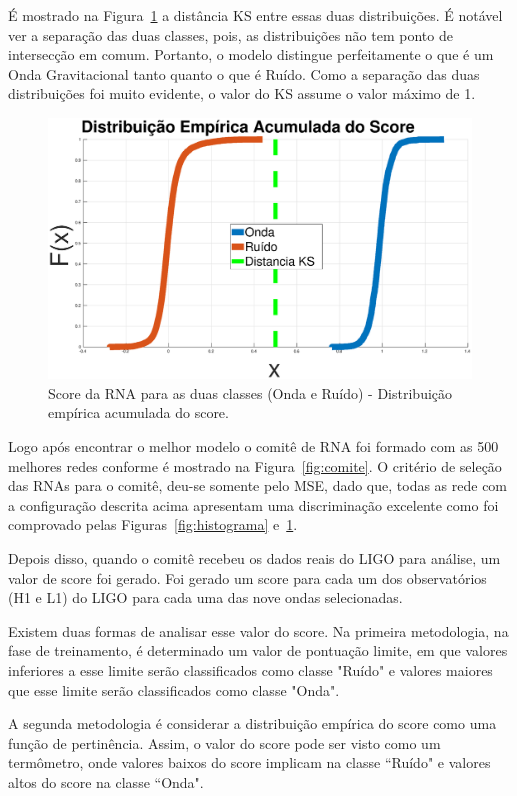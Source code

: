 É mostrado na Figura~\ref{fig:KS} a distância KS entre essas duas distribuições. É notável ver a separação das duas classes, pois, as distribuições não tem ponto de intersecção em comum. Portanto, o modelo distingue perfeitamente o que é um Onda Gravitacional tanto quanto o que é Ruído. Como a separação das duas distribuições foi muito evidente, o valor do KS assume o valor máximo de 1.

\begin{figure}[H]
\centering
\includegraphics[width=1\textwidth]{figuras/KS.eps}
\caption{Score da RNA para as duas classes (Onda e Ruído) - Distribuição  empírica acumulada do score.}
\label{fig:KS}
\end{figure}

Logo após encontrar o melhor modelo o comitê de RNA foi formado com as 500 melhores redes conforme é mostrado na Figura~\ref{fig:comite}. O critério de seleção das RNAs para o comitê, deu-se somente pelo MSE, dado que, todas as rede com a configuração descrita acima apresentam uma discriminação excelente como foi comprovado pelas Figuras~\ref{fig:histograma} e~\ref{fig:KS}.

Depois disso, quando o comitê recebeu os dados reais do LIGO para análise, um valor de score foi gerado. Foi gerado um score para cada um dos observatórios (H1 e L1) do LIGO para cada uma das nove ondas selecionadas.

Existem duas formas de analisar esse valor do score. Na primeira metodologia, na fase de treinamento, é determinado um valor de pontuação limite, em que valores inferiores a esse limite serão classificados como classe "Ruído" e valores maiores que esse limite serão classificados como classe "Onda". 

A segunda metodologia é considerar a distribuição empírica do score como uma função de pertinência. Assim, o valor do score pode ser visto como um termômetro, onde valores baixos do score implicam na classe ``Ruído" e valores altos do score na classe ``Onda".

